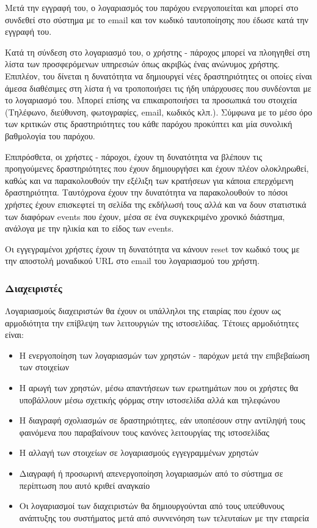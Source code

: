 \documentclass[letterpaper,6pt]{article}
\begin{document}
Μετά την εγγραφή του, ο λογαριασμός του παρόχου ενεργοποιείται και μπορεί στο συνδεθεί στο σύστημα με το email και τον κωδικό ταυτοποίησης που έδωσε κατά την εγγραφή του.

Κατά τη σύνδεση στο λογαριασμό του, ο χρήστης - πάροχος μπορεί να πλοηγηθεί στη λίστα των προσφερόμενων υπηρεσιών όπως ακριβώς ένας ανώνυμος χρήστης. Επιπλέον, του δίνεται η δυνατότητα να δημιουργεί νέες δραστηριότητες οι οποίες είναι άμεσα διαθέσιμες στη λίστα ή να τροποποιήσει τις ήδη υπάρχουσες που συνδέονται με το λογαριασμό του. Μπορεί επίσης να επικαιροποιήσει τα προσωπικά του στοιχεία (Τηλέφωνο, διεύθυνση, φωτογραφίες, email, κωδικός κλπ.). Σύμφωνα με το μέσο όρο των κριτικών στις δραστηριότητες του κάθε παρόχου προκύπτει και μία συνολική βαθμολογία του παρόχου.

Επιπρόσθετα, οι χρήστες - πάροχοι, έχουν τη δυνατότητα να βλέπουν τις προηγούμενες δραστηριότητες που έχουν δημιουργήσει και έχουν πλέον ολοκληρωθεί, καθώς και να παρακολουθούν την εξέλιξη των κρατήσεων για κάποια επερχόμενη δραστηριότητα. Ταυτόχρονα έχουν την δυνατότητα 
να παρακολουθούν το πόσοι χρήστες έχουν επισκεφτεί τη σελίδα της εκδήλωσή τους αλλά και να δουν στατιστικά των διαφόρων events που έχουν, μέσα σε ένα συγκεκριμένο χρονικό διάστημα, ανάλογα με την ηλικία και το είδος των events.
      
Οι εγγεγραμένοι χρήστες έχουν τη δυνατότητα να κάνουν reset τον κωδικό τους με την αποστολή μοναδικού URL στο email του λογαριασμού του χρήστη.

\subsubsection{Διαχειριστές}
Λογαριασμούς διαχειριστών θα έχουν οι υπάλληλοι της εταιρίας που έχουν ως αρμοδιότητα την επίβλεψη των λειτουργιών της ιστοσελίδας. Τέτοιες αρμοδιότητες είναι:
\begin{itemize}
  \item Η ενεργοποίηση των λογαριασμών των χρηστών - παρόχων μετά την επιβεβαίωση των στοιχείων
  \item Η αρωγή των χρηστών, μέσω απαντήσεων των ερωτημάτων που οι χρήστες θα υποβάλλουν μέσω σχετικής φόρμας στην ιστοσελίδα αλλά και τηλεφώνου
  \item Η διαγραφή σχολιασμών σε δραστηριότητες, εάν υποπέσουν στην αντίληψή τους φαινόμενα που παραβαίνουν τους κανόνες λειτουργίας της ιστοσελίδας
  \item Η αλλαγή των στοιχείων σε λογαριασμούς εγγεγραμμένων χρηστών
  \item Διαγραφή ή προσωρινή απενεργοποίηση λογαριασμών από το σύστημα σε περίπτωση που αυτό κριθεί αναγκαίο
  \item Οι λογαριασμοί των διαχειριστών θα δημιουργούνται από τους υπεύθυνους ανάπτυξης του συστήματος μετά από συννενόηση των τελευταίων με την εταιρεία
\end{itemize}
\end{document}
